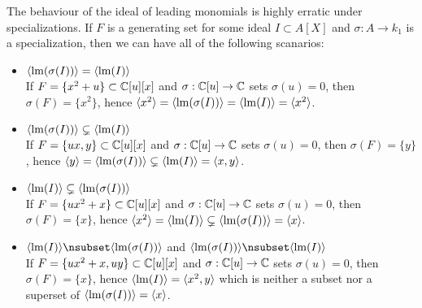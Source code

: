 \begin{example}\upshape
  The behaviour of the ideal of leading monomials is highly erratic under specializations. If $F$ is a generating set for some ideal $I \subset A[X]$ and $\sigma : A \to k_{1}$ is a specialization, then we can have all of the following scanarios:
  \begin{itemize}
    \item $\langle \operatorname{lm}(\sigma(I)) \rangle = \langle \operatorname{lm}(I) \rangle$ \\ If $F = \{x^{2} + u\} \subset \mathbb{C}[u][x]$ and $\sigma : \mathbb{C}[u] \to \mathbb{C}$ sets $\sigma(u) = 0$, then $\sigma(F) = \{x^{2}\}$, hence $\langle x^{2} \rangle = \langle \operatorname{lm}(\sigma(I)) \rangle = \langle \operatorname{lm}(I) \rangle = \langle x^{2} \rangle$.

    \item $\langle \operatorname{lm}(\sigma(I)) \rangle \subsetneq \langle \operatorname{lm}(I) \rangle$ \\ If $F = \{ux, y\} \subset \mathbb{C}[u][x]$ and $\sigma : \mathbb{C}[u] \to \mathbb{C}$ sets $\sigma(u) = 0$, then $\sigma(F) = \{y\}$, hence $\langle y \rangle = \langle \operatorname{lm}(\sigma(I)) \rangle \subsetneq \langle \operatorname{lm}(I) \rangle = \langle x, y \rangle$.

    \item $\langle \operatorname{lm}(I) \rangle \subsetneq \langle \operatorname{lm}(\sigma(I)) \rangle$ \\ If $F = \{ux^{2} + x\} \subset \mathbb{C}[u][x]$ and $\sigma : \mathbb{C}[u] \to \mathbb{C}$ sets $\sigma(u) = 0$, then $\sigma(F) = \{x\}$, hence $\langle x^{2} \rangle = \langle \operatorname{lm}(I) \rangle \subsetneq \langle \operatorname{lm}(\sigma(I)) \rangle = \langle x \rangle$.

    \item $\langle \LM(I) \rangle \nsubset \langle \LM(\sigma(I)) \rangle$ and $\langle \LM(\sigma(I)) \rangle \nsubset \langle \LM(I) \rangle$ \\ If $F = \{ux^{2} + x, uy\} \subset \mathbb{C}[u][x]$ and $\sigma : \mathbb{C}[u] \to \mathbb{C}$ sets $\sigma(u) = 0$, then $\sigma(F) = \{x\}$, hence $\langle \operatorname{lm}(I) \rangle = \langle x^{2}, y \rangle$ which is neither a subset nor a superset of $\langle \operatorname{lm}(\sigma(I)) \rangle = \langle x \rangle$.
  \end{itemize}
\end{example}



